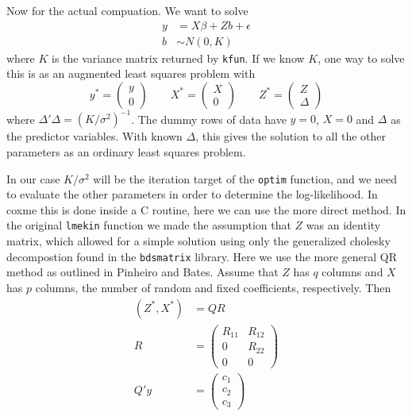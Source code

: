\documentclass{article}
\begin{document}
Now for the actual compuation.
We want to solve
\begin{align*}
  y & = X\beta + Zb + \epsilon \\
  b & \sim N(0, K)
\end{align*}
where $K$ is the variance matrix returned by {\tt{}kfun}.
If we know $K$, one way to solve this is as an augmented
least squares problem with
\begin{equation*}
  y^*=\left(\begin{array}{c} y\\0 \end{array} \right) \qquad
  X^*=\left(\begin{array}{c} X\\0 \end{array} \right) \qquad
  Z^*=\left(\begin{array}{c} Z\\ \Delta  \end{array} \right)
\end{equation*}
where $\Delta' \Delta= (K/\sigma^2)^{-1}$.                       %
The dummy rows of data have $y=0$, $X=0$ and $\Delta$ as
the predictor variables.
With known $\Delta$, this gives the solution to all the other
parameters as an ordinary least squares problem.


In our case $K/\sigma^2$ will be the iteration target of the
{\tt{}optim} function, and we need to 
evaluate the other parameters in order to determine the log-likelihood.
In coxme this is done inside a C routine, here we can use the
more direct method.
In the original {\tt{}lmekin} function we made the assumption that
$Z$ was an identity matrix, which allowed for a simple solution
using only the generalized cholesky decompostion found in the
{\tt{}bdsmatrix} library.
Here we use the more general QR method as outlined in Pinheiro and
Bates.  
Assume that $Z$ has $q$ columns and $X$ has $p$ columns, the number
of random and fixed coefficients, respectively.
Then
\begin{align*}
  \left(Z^*, X^* \right) &= QR \\
  R &= \left( \begin{array}{cc} R_{11}& R_{12} \\ 0& R_{22} \\
                                0 & 0
    \end{array} \right) \\
  Q'y &= \left( \begin{array}{c} c_1 \\ c_2 \\ c_3 \end{array} \right)
\end{align*}                                                         %
\end{document}
